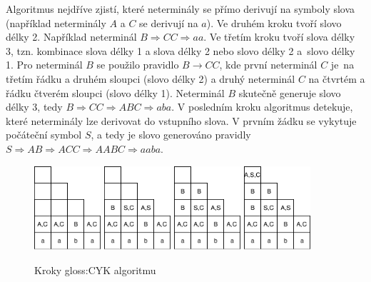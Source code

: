 	Algoritmus nejdříve zjistí, které neterminály se přímo derivují na symboly slova (například neterminály $A$ a $C$ se derivují na $a$). Ve druhém kroku tvoří slovo délky 2. Například neterminál $B\Rightarrow CC\Rightarrow aa$. Ve třetím kroku tvoří slova délky 3, tzn. kombinace slova délky 1 a slova délky 2 nebo slovo délky 2 a~slovo délky 1. Pro neterminál $B$ se použilo pravidlo $B\rightarrow CC$, kde první neterminál $C$ je~na třetím řádku a druhém sloupci (slovo délky 2) a druhý neterminál $C$ na čtvrtém a řádku čtverém sloupci (slovo délky 1). Neterminál $B$ skutečně generuje slovo délky 3, tedy $B\Rightarrow CC \Rightarrow ABC \Rightarrow aba$. V posledním kroku algoritmus detekuje, které neterminály lze derivovat do vstupního slova. V prvním žádku se vykytuje počáteční symbol $S$, a tedy je slovo generováno pravidly $S \Rightarrow AB \Rightarrow ACC \Rightarrow AABC \Rightarrow aaba$.
	
	\begin{figure}
		\centering
		\includegraphics[width=0.22\textwidth]{img/CYKDemo1STEP1}
		\includegraphics[width=0.22\textwidth]{img/CYKDemo1STEP2}
		\includegraphics[width=0.22\textwidth]{img/CYKDemo1STEP3}
		\includegraphics[width=0.22\textwidth]{img/CYKDemo1STEP4}
		\caption{Kroky \gls{gloss:CYK} algoritmu}
		\label{pic:cykSteps}
	\end{figure}
	
